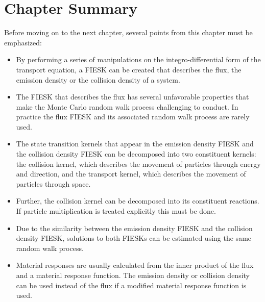 \section{Chapter Summary}
Before moving on to the next chapter, several points from this chapter must
be emphasized:
\begin{itemize}
  \item By performing a series of manipulations on the integro-differential 
    form of the transport equation, a FIESK can be created that describes the 
    flux, the emission density or the collision density of a system.
  \item The FIESK that describes the flux has several unfavorable properties
    that make the Monte Carlo random walk process challenging to conduct. In
    practice the flux FIESK and its associated random walk process are rarely
    used.
  \item The state transition kernels that appear in the emission density FIESK
    and the collision density FIESK can be decomposed into two constituent
    kernels: the collision kernel, which describes the movement of particles
    through energy and direction, and the transport kernel, which describes
    the movement of particles through space.
  \item Further, the collision kernel can be decomposed into its constituent
    reactions. If particle multiplication is treated explicitly this must be
    done.
  \item Due to the similarity between the emission density FIESK and the
    collision density FIESK, solutions to both FIESKs can be estimated using
    the same random walk process.
  \item Material responses are usually calculated from the inner product of
    the flux and a material response function. The emission density or collision
    density can be used instead of the flux if a modified material response
    function is used.
\end{itemize}
